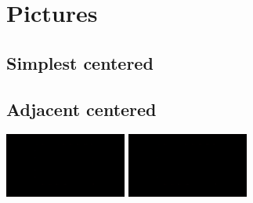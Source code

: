 
\section{Pictures}

\subsection{Simplest centered}
\begin{figure}[!ht]
    \begin{minipage}{\linewidth}
        \centering
    \end{minipage}
\end{figure}

\subsection{Adjacent centered}
\begin{center}
    \includegraphics[width=0.3\textwidth]{images/Bias-Variance Tradeoff_03.png}
    \hspace{1em}
    \includegraphics[width=0.3\textwidth]{images/Bias-Variance Tradeoff_04.png}
\end{center}


